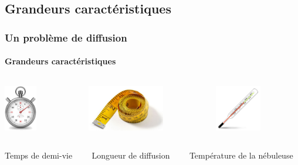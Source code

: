 \documentclass{beamer}
\begin{document}
\subsection{Grandeurs caractéristiques}

\begin{frame}
	\frametitle{Un problème de diffusion}
	\framesubtitle{Grandeurs caractéristiques}
	

\begin{columns}
    \begin{column}{4cm}
      \center \includegraphics[height =  2cm]{figures/chrono.png}
	\end{column}

	\begin{column}{4cm}
      \center \includegraphics[height = 2cm]{figures/ruban.png}
	\end{column}
	
	\begin{column}{4cm}
      \center \includegraphics[height = 2cm]{figures/thermo.png}
	\end{column}
\end{columns}

\vspace{0.5cm}

\begin{columns}
    \begin{column}{4cm}
      \center
      Temps de demi-vie
	\end{column}

	\begin{column}{4cm}
      \center
      Longueur de diffusion 
	\end{column}
	
	\begin{column}{4cm}
      \center
      Température de la nébuleuse
	\end{column}
\end{columns}


\end{frame}
\end{document}
